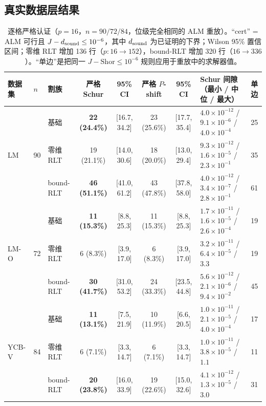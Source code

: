 \subsection{真实数据层结果}\label{app:real}
\begin{table}[t]
\centering
\caption{逐格严格认证（$p=16$，$n=90/72/84$，位级完全相同的 ALM 重放）。“cert” = ALM 可行且 $J-d_{\rm sound}\le10^{-6}$，其中 $d_{\rm sound}$ 为已证明的下界；Wilson 95\% 置信区间；零维 RLT 增加 136 行（$p:16\to152$），bound-RLT 增加 320 行（$16\to336$）。“单边”是把同一 $J-\mathrm{Shor}\le10^{-6}$ 规则应用于重放中的求解器值。}
\label{tab:rigorous_full}
\scriptsize
\setlength{\tabcolsep}{2pt}
\begin{tabular}{@{}llp{1.3cm}ccccp{4.4cm}c@{}}
\toprule
数据集 & $n$ & 割族 & 严格 Schur & 95\% CI & 严格 $P$-shift & 95\% CI & Schur 间隙（最小 / 中位 / 最大） & 单边 \\
\midrule
\multirow{3}{*}{LM} & \multirow{3}{*}{90} & 基础 & \textbf{22 (24.4\%)} & [16.7, 34.2] & 23 (25.6\%) & [17.7, 35.4] & $4.0{\times}10^{-12}$ / $9.1{\times}10^{-6}$ / $4.0{\times}10^{-4}$ & 25 \\
 & & 零维 RLT & 19 (21.1\%) & [14.0, 30.6] & 18 (20.0\%) & [13.0, 29.4] & $9.3{\times}10^{-12}$ / $1.6{\times}10^{-5}$ / $2.3{\times}10^{-1}$ & 35 \\
 & & bound-RLT & \textbf{46 (51.1\%)} & [41.0, 61.2] & 43 (47.8\%) & [37.8, 58.0] & $4.0{\times}10^{-12}$ / $3.4{\times}10^{-7}$ / $2.8{\times}10^{-1}$ & 61 \\
\midrule
\multirow{3}{*}{LM-O} & \multirow{3}{*}{72} & 基础 & \textbf{11 (15.3\%)} & [8.8, 25.3] & 11 (15.3\%) & [8.8, 25.3] & $1.7{\times}10^{-11}$ / $1.6{\times}10^{-5}$ / $2.6{\times}10^{-4}$ & 19 \\
 & & 零维 RLT & 6 (8.3\%) & [3.9, 17.0] & 6 (8.3\%) & [3.9, 17.0] & $3.2{\times}10^{-11}$ / $6.4{\times}10^{-5}$ / $3.3$ & 19 \\
 & & bound-RLT & \textbf{30 (41.7\%)} & [31.0, 53.2] & 24 (33.3\%) & [23.5, 44.8] & $5.6{\times}10^{-12}$ / $2.1{\times}10^{-6}$ / $9.4{\times}10^{-2}$ & 45 \\
\midrule
\multirow{3}{*}{YCB-V} & \multirow{3}{*}{84} & 基础 & \textbf{11 (13.1\%)} & [7.5, 21.9] & 10 (11.9\%) & [6.6, 20.5] & $1.0{\times}10^{-11}$ / $2.1{\times}10^{-5}$ / $4.0{\times}10^{-4}$ & 17 \\
 & & 零维 RLT & 6 (7.1\%) & [3.3, 14.7] & 6 (7.1\%) & [3.3, 14.7] & $1.0{\times}10^{-11}$ / $3.8{\times}10^{-5}$ / $1.1$ & 11 \\
 & & bound-RLT & \textbf{20 (23.8\%)} & [16.0, 33.9] & 19 (22.6\%) & [15.0, 32.6] & $4.1{\times}10^{-12}$ / $1.3{\times}10^{-5}$ / $3.0$ & 31 \\
\bottomrule
\end{tabular}
\end{table}

